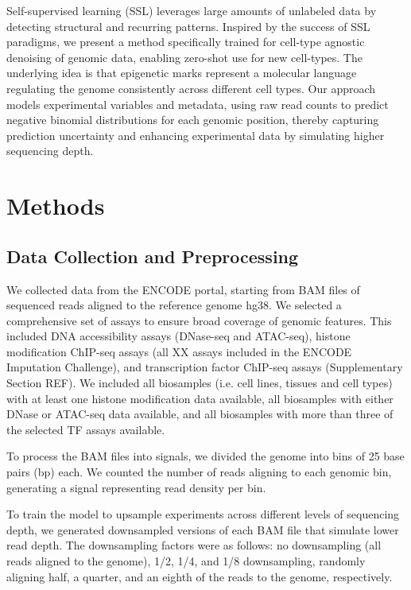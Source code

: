 \documentclass[twoside,11pt]{article}
\begin{document}
Self-supervised learning (SSL) leverages large amounts of unlabeled data by detecting structural and recurring patterns. Inspired by the success of SSL paradigms, we present a method specifically trained for cell-type agnostic denoising of genomic data, enabling zero-shot use for new cell-types. The underlying idea is that epigenetic marks represent a molecular language regulating the genome consistently across different cell types. Our approach models experimental variables and metadata, using raw read counts to predict negative binomial distributions for each genomic position, thereby capturing prediction uncertainty and enhancing experimental data by simulating higher sequencing depth.



\section{Methods}
\subsection{Data Collection and Preprocessing}
We collected data from the ENCODE portal, starting from BAM files of sequenced reads aligned to the reference genome hg38. We selected a comprehensive set of assays to ensure broad coverage of genomic features. This included DNA accessibility assays (DNase-seq and ATAC-seq), histone modification ChIP-seq assays (all XX assays included in the ENCODE Imputation Challenge), and transcription factor ChIP-seq assays (Supplementary Section REF). 
We included all biosamples (i.e. cell lines, tissues and cell types) with at least one histone modification data available, all biosamples with either DNase or ATAC-seq data available, and all biosamples with more than three of the selected TF assays available.


To process the BAM files into signals, we divided the genome into bins of 25 base pairs (bp) each. We counted the number of reads aligning to each genomic bin, generating a signal representing read density per bin.

To train the model to upsample experiments across different levels of sequencing depth, we generated downsampled versions of each BAM file that simulate lower read depth. The downsampling factors were as follows: no downsampling (all reads aligned to the genome), 1/2, 1/4, and 1/8 downsampling, randomly aligning half, a quarter, and an eighth of the reads to the genome, respectively.
\end{document}

